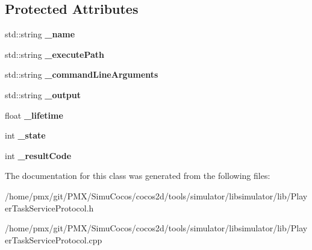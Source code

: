 \subsection*{Protected Attributes}
\begin{DoxyCompactItemize}
\item 
\mbox{\label{classPlayerTask_a12fe8687a5890690c1b04a2e45987531}} 
std\+::string {\bfseries \+\_\+name}
\item 
\mbox{\label{classPlayerTask_ab4d693f3e7358a2b39c486c964d5001d}} 
std\+::string {\bfseries \+\_\+execute\+Path}
\item 
\mbox{\label{classPlayerTask_a3a61410837d40fd2f546f3ecd0fdef02}} 
std\+::string {\bfseries \+\_\+command\+Line\+Arguments}
\item 
\mbox{\label{classPlayerTask_a54fe461cfee2a463928b29a108509f21}} 
std\+::string {\bfseries \+\_\+output}
\item 
\mbox{\label{classPlayerTask_a67d6a3c6faf4eab6f74ff644a9ade87f}} 
float {\bfseries \+\_\+lifetime}
\item 
\mbox{\label{classPlayerTask_a33323feb59dc5adb14aacd2d8cc76b57}} 
int {\bfseries \+\_\+state}
\item 
\mbox{\label{classPlayerTask_a3d32ae99c9ba91a210189a2ca823ef28}} 
int {\bfseries \+\_\+result\+Code}
\end{DoxyCompactItemize}


The documentation for this class was generated from the following files\+:\begin{DoxyCompactItemize}
\item 
/home/pmx/git/\+P\+M\+X/\+Simu\+Cocos/cocos2d/tools/simulator/libsimulator/lib/Player\+Task\+Service\+Protocol.\+h\item 
/home/pmx/git/\+P\+M\+X/\+Simu\+Cocos/cocos2d/tools/simulator/libsimulator/lib/Player\+Task\+Service\+Protocol.\+cpp\end{DoxyCompactItemize}
